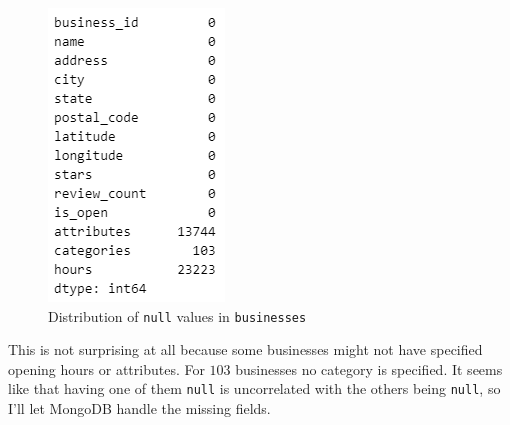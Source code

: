 \documentclass{Configuration_Files/PoliMi3i_thesis}
\begin{document}
\begin{figure}[H]
    \centering
    \includegraphics[width=1\columnwidth / 3]{imgs/null_count_businesses.png}
    \caption{Distribution of \texttt{null} values in \texttt{businesses}}
    \label{fig:null_count_businesses}
\end{figure}

\bigskip

This is not surprising at all because some businesses might not have specified opening hours or attributes. For $103$ businesses no category is specified. It seems like that having one of them \texttt{null} is uncorrelated with the others being \texttt{null}, so I'll let MongoDB handle the missing fields.
\end{document}
